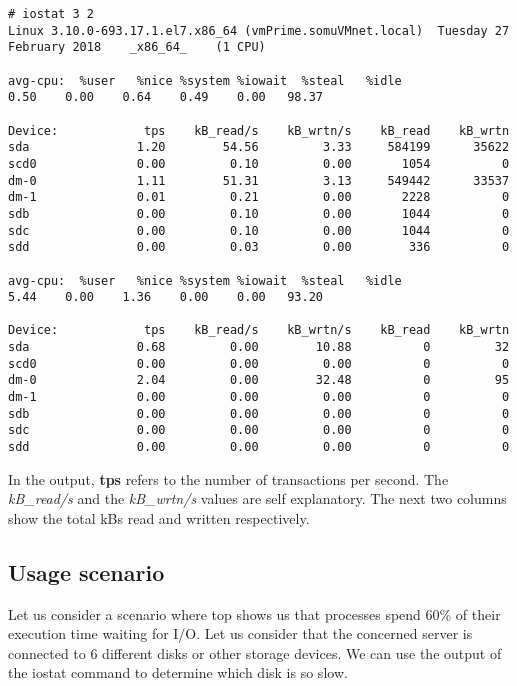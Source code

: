 \vspace{-15pt}
\begin{verbatim}
# iostat 3 2
Linux 3.10.0-693.17.1.el7.x86_64 (vmPrime.somuVMnet.local) 	Tuesday 27 February 2018 	_x86_64_	(1 CPU)

avg-cpu:  %user   %nice %system %iowait  %steal   %idle
0.50    0.00    0.64    0.49    0.00   98.37

Device:            tps    kB_read/s    kB_wrtn/s    kB_read    kB_wrtn
sda               1.20        54.56         3.33     584199      35622
scd0              0.00         0.10         0.00       1054          0
dm-0              1.11        51.31         3.13     549442      33537
dm-1              0.01         0.21         0.00       2228          0
sdb               0.00         0.10         0.00       1044          0
sdc               0.00         0.10         0.00       1044          0
sdd               0.00         0.03         0.00        336          0

avg-cpu:  %user   %nice %system %iowait  %steal   %idle
5.44    0.00    1.36    0.00    0.00   93.20

Device:            tps    kB_read/s    kB_wrtn/s    kB_read    kB_wrtn
sda               0.68         0.00        10.88          0         32
scd0              0.00         0.00         0.00          0          0
dm-0              2.04         0.00        32.48          0         95
dm-1              0.00         0.00         0.00          0          0
sdb               0.00         0.00         0.00          0          0
sdc               0.00         0.00         0.00          0          0
sdd               0.00         0.00         0.00          0          0
\end{verbatim}
\vspace{-10pt}	

\noindent
In the output, \textbf{tps} refers to the number of transactions per second. The \textit{kB\_read/s} and the \textit{kB\_wrtn/s} values are self explanatory. The next two columns show the total kBs read and written respectively. 

\subsection{Usage scenario}
\vspace{-7pt}
Let us consider a scenario where top shows us that processes spend 60\% of their execution time waiting for I/O. Let us consider that the concerned server is connected to 6 different disks or other storage devices. We can use the output of the iostat command to determine which disk is so slow. 

